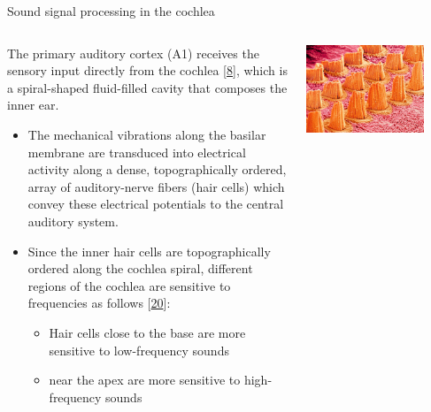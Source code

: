 \documentclass[10pt,american,ignorenonframetext,aspectratio=1610]{beamer}
\providecommand{\tightlist}{%
  \setlength{\itemsep}{0pt}\setlength{\parskip}{0pt}}
\theoremstyle{remark}
\begin{document}
\begin{frame}{Sound signal processing in the cochlea}
\protect\hypertarget{sound-signal-processing-in-the-cochlea}{}

\begin{columns}[T]
\begin{column}{0.7\textwidth}
The primary auditory cortex (A1) receives the sensory input directly
from the cochlea {[}\protect\hyperlink{ref-dallos1996}{8}{]}, which is a
spiral-shaped fluid-filled cavity that composes the inner ear.

\begin{itemize}
\tightlist
\item
  The mechanical vibrations along the basilar membrane are transduced
  into electrical activity along a dense, topographically ordered, array
  of auditory-nerve fibers (hair cells) which convey these electrical
  potentials to the central auditory system.
\item
  Since the inner hair cells are topographically ordered along the
  cochlea spiral, different regions of the cochlea are sensitive to
  frequencies as follows {[}\protect\hyperlink{ref-yang1992}{20}{]}:

  \begin{itemize}
  \tightlist
  \item
    Hair cells close to the base are more sensitive to low-frequency
    sounds
  \item
    near the apex are more sensitive to high-frequency sounds
  \end{itemize}
\end{itemize}
\end{column}

\begin{column}{0.3\textwidth}
\centering

\includegraphics[width=0.8\textwidth,height=\textheight]{img/hair_cells.jpg}


\end{column}
\end{columns}
\end{frame}
\end{document}
